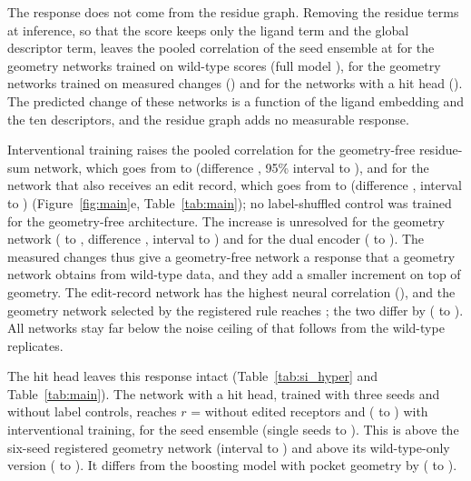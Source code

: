 The response does not come from the residue graph. Removing the residue terms at inference, so that the score keeps only the ligand term and the global descriptor term, leaves the pooled correlation of the seed ensemble at \ablNoResRsgWt{} for the geometry networks trained on wild-type scores (full model \ablFullRsgWt{}), \ablNoResRsgInt{} for the geometry networks trained on measured changes (\ablFullRsgInt{}) and \ablNoResRsghInt{} for the networks with a hit head (\ablFullRsghInt{}). The predicted change of these networks is a function of the ligand embedding and the ten descriptors, and the residue graph adds no measurable response.

Interventional training raises the pooled correlation for the geometry-free residue-sum network, which goes from \rEnsRsWt{} to \rEnsRsInt{} (difference \diffRsIntMinusRsWt{}, 95\% interval \diffLoRsIntMinusRsWt{} to \diffHiRsIntMinusRsWt{}), and for the network that also receives an edit record, which goes from \rEnsRseWt{} to \rEnsRseInt{} (difference \diffRseIntMinusRseWt{}, interval \diffLoRseIntMinusRseWt{} to \diffHiRseIntMinusRseWt{}) (Figure~\ref{fig:main}e, Table~\ref{tab:main}); no label-shuffled control was trained for the geometry-free architecture. The increase is unresolved for the geometry network (\rEnsRsgWt{} to \rEnsRsgInt{}, difference \diffRsgIntMinusRsgWt{}, interval \diffLoRsgIntMinusRsgWt{} to \diffHiRsgIntMinusRsgWt{}) and for the dual encoder (\rEnsBfiveWt{} to \rEnsBfiveInt{}). The measured changes thus give a geometry-free network a response that a geometry network obtains from wild-type data, and they add a smaller increment on top of geometry. The edit-record network has the highest neural correlation (\rEnsRseInt{}), and the geometry network selected by the registered rule reaches \rEnsRsgInt{}; the two differ by \diffRsgIntMinusRseInt{} (\diffLoRsgIntMinusRseInt{} to \diffHiRsgIntMinusRseInt{}). All networks stay far below the noise ceiling of \ceilingR{} that follows from the wild-type replicates.

The hit head leaves this response intact (Table~\ref{tab:si_hyper} and Table~\ref{tab:main}). The network with a hit head, trained with three seeds and without label controls, reaches $r$ = \rEnsRsghWt{} without edited receptors and \rEnsRsghInt{} (\rLoRsghInt{} to \rHiRsghInt{}) with interventional training, for the seed ensemble (single seeds \rSeedMinRsghInt{} to \rSeedMaxRsghInt{}). This is \diffRsghIntMinusRsgInt{} above the six-seed registered geometry network (interval \diffLoRsghIntMinusRsgInt{} to \diffHiRsghIntMinusRsgInt{}) and \diffRsghIntMinusRsghWt{} above its wild-type-only version (\diffLoRsghIntMinusRsghWt{} to \diffHiRsghIntMinusRsghWt{}). It differs from the boosting model with pocket geometry by \diffRsghIntMinusGbmGeo{} (\diffLoRsghIntMinusGbmGeo{} to \diffHiRsghIntMinusGbmGeo{}).

